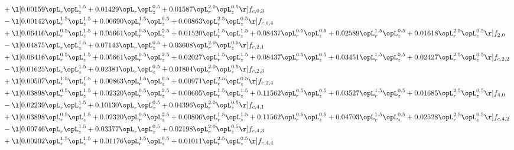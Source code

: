 \begin{alignat}{2}
& + \l[  0.00159 \opL_r \opL_z^{1.5} +  0.01429 \opL_r \opL_z^{0.5} +  0.01587 \opL_r^{2.0} \opL_z^{0.5}  \r] f_{c,0,3} \nonumber \\ 
& - \l[  0.00142 \opL_r^{1.5} \opL_z^{1.5} +  0.00690 \opL_r^{1.5} \opL_z^{0.5} +  0.00863 \opL_r^{2.5} \opL_z^{0.5}  \r] f_{c,0,4} \nonumber \\ 
& + \l[  0.06416 \opL_r^{0.5} \opL_z^{1.5} +  0.05661 \opL_r^{0.5} \opL_z^{2.5} +  0.01520 \opL_r^{1.5} \opL_z^{1.5} +  0.08437 \opL_r^{0.5} \opL_z^{0.5} +  0.02589 \opL_r^{1.5} \opL_z^{0.5} +  0.01618 \opL_r^{2.5} \opL_z^{0.5}  \r] f_{2,0} \nonumber \\ 
& - \l[  0.04875 \opL_r \opL_z^{1.5} +  0.07143 \opL_r \opL_z^{0.5} +  0.03608 \opL_r^{2.0} \opL_z^{0.5}  \r] f_{c,2,1} \nonumber \\ 
& + \l[  0.06416 \opL_r^{0.5} \opL_z^{1.5} +  0.05661 \opL_r^{0.5} \opL_z^{2.5} +  0.02027 \opL_r^{1.5} \opL_z^{1.5} +  0.08437 \opL_r^{0.5} \opL_z^{0.5} +  0.03451 \opL_r^{1.5} \opL_z^{0.5} +  0.02427 \opL_r^{2.5} \opL_z^{0.5}  \r] f_{c,2,2} \nonumber \\ 
& - \l[  0.01625 \opL_r \opL_z^{1.5} +  0.02381 \opL_r \opL_z^{0.5} +  0.01804 \opL_r^{2.0} \opL_z^{0.5}  \r] f_{c,2,3} \nonumber \\ 
& + \l[  0.00507 \opL_r^{1.5} \opL_z^{1.5} +  0.00863 \opL_r^{1.5} \opL_z^{0.5} +  0.00971 \opL_r^{2.5} \opL_z^{0.5}  \r] f_{c,2,4} \nonumber \\ 
& + \l[  0.03898 \opL_r^{0.5} \opL_z^{1.5} +  0.02320 \opL_r^{0.5} \opL_z^{2.5} +  0.00605 \opL_r^{1.5} \opL_z^{1.5} +  0.11562 \opL_r^{0.5} \opL_z^{0.5} +  0.03527 \opL_r^{1.5} \opL_z^{0.5} +  0.01685 \opL_r^{2.5} \opL_z^{0.5}  \r] f_{4,0} \nonumber \\ 
& - \l[  0.02239 \opL_r \opL_z^{1.5} +  0.10130 \opL_r \opL_z^{0.5} +  0.04396 \opL_r^{2.0} \opL_z^{0.5}  \r] f_{c,4,1} \nonumber \\ 
& + \l[  0.03898 \opL_r^{0.5} \opL_z^{1.5} +  0.02320 \opL_r^{0.5} \opL_z^{2.5} +  0.00806 \opL_r^{1.5} \opL_z^{1.5} +  0.11562 \opL_r^{0.5} \opL_z^{0.5} +  0.04703 \opL_r^{1.5} \opL_z^{0.5} +  0.02528 \opL_r^{2.5} \opL_z^{0.5}  \r] f_{c,4,2} \nonumber \\ 
& - \l[  0.00746 \opL_r \opL_z^{1.5} +  0.03377 \opL_r \opL_z^{0.5} +  0.02198 \opL_r^{2.0} \opL_z^{0.5}  \r] f_{c,4,3} \nonumber \\ 
& + \l[  0.00202 \opL_r^{1.5} \opL_z^{1.5} +  0.01176 \opL_r^{1.5} \opL_z^{0.5} +  0.01011 \opL_r^{2.5} \opL_z^{0.5}  \r] f_{c,4,4} \nonumber \\ 
\end{alignat} 


